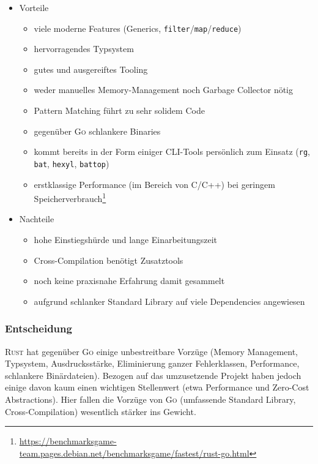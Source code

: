 \begin{itemize}
	\item Vorteile
		\begin{itemize}
			\item viele moderne Features (Generics, \texttt{filter}/\texttt{map}/\texttt{reduce})
			\item hervorragendes Typsystem
			\item gutes und ausgereiftes Tooling
			\item weder manuelles Memory-Management noch Garbage Collector nötig
			\item Pattern Matching führt zu sehr solidem Code
			\item gegenüber \textsc{Go} schlankere Binaries
			\item kommt bereits in der Form einiger CLI-Tools persönlich zum Einsatz (\texttt{rg}, \texttt{bat}, \texttt{hexyl}, \texttt{battop})
			\item erstklassige Performance (im Bereich von C/C++) bei geringem Speicherverbrauch\footnote{\url{https://benchmarksgame-team.pages.debian.net/benchmarksgame/fastest/rust-go.html}}
		\end{itemize}
	\item Nachteile
		\begin{itemize}
			\item hohe Einstiegshürde und lange Einarbeitungszeit
			\item Cross-Compilation benötigt Zusatztools
			\item noch keine praxisnahe Erfahrung damit gesammelt
			\item aufgrund schlanker Standard Library auf viele Dependencies angewiesen
		\end{itemize}
\end{itemize}

\subsubsection{Entscheidung}

\textsc{Rust} hat gegenüber \textsc{Go} einige unbestreitbare Vorzüge (Memory Management, Typsystem, Ausdrucksstärke, Eliminierung ganzer Fehlerklassen, Performance, schlankere Binärdateien). Bezogen auf das umzusetzende Projekt haben jedoch einige davon kaum einen wichtigen Stellenwert (etwa Performance und Zero-Cost Abstractions). Hier fallen die Vorzüge von \textsc{Go} (umfassende Standard Library, Cross-Compilation) wesentlich stärker ins Gewicht.

